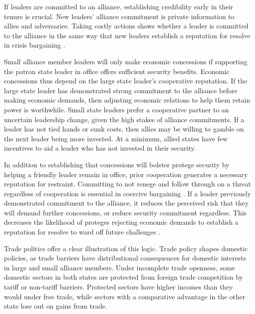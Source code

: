 \documentclass[12pt]{article}
\begin{document}
If leaders are committed to an alliance, establishing credibility early in their tenure is crucial. 
New leaders' alliance commitment is private information to allies and adversaries. 
Taking costly actions shows whether a leader is committed to the alliance in the same way that new leaders establish a reputation for resolve in crisis bargaining \citep{Wolford2007}. 


Small alliance member leaders will only make economic concessions if supporting the patron state leader in office offers sufficient security benefits. 
Economic concessions thus depend on the large state leader's cooperative reputation. 
If the large state leader has demonstrated strong commitment to the alliance before making economic demands, then adjusting economic relations to help them retain power is worthwhile.
Small state leaders prefer a cooperative partner to an uncertain leadership change, given the high stakes of alliance commitments.
If a leader has not tied hands or sunk costs, then allies may be willing to gamble on the next leader being more invested. 
At a minimum, allied states have few incentives to aid a leader who has not invested in their security. 


In addition to establishing that concessions will bolster protege security by helping a friendly leader remain in office, prior cooperation generates a necessary reputation for restraint. 
Committing to not renege and follow through on a threat regardless of cooperation is essential in coercive bargaining \citep{Cebuletal2021}. 
If a leader previously demonstrated commitment to the alliance, it reduces the perceived risk that they will demand further concessions, or reduce security commitment regardless.
This decreases the likelihood of proteges rejecting economic demands to establish a reputation for resolve to ward off future challenges \citep{Sechser2010, Sechser2018}. 


Trade politics offer a clear illustration of this logic.
Trade policy shapes domestic policies, as trade barriers have distributional consequences for domestic interests in large and small alliance members.
Under incomplete trade openness, some domestic sectors in both states are protected from foreign trade competition by tariff or non-tariff barriers. 
Protected sectors have higher incomes than they would under free trade, while sectors with a comparative advantage in the other state lose out on gains from trade. 
\end{document}
